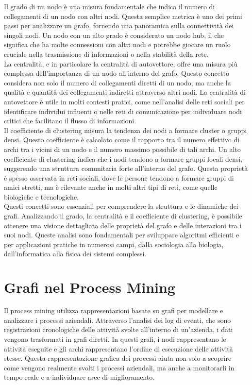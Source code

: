 \documentclass{article}
\begin{document}
Il grado di un nodo è una misura fondamentale che indica il numero di collegamenti di un nodo con altri nodi. Questa semplice metrica è uno dei primi passi per analizzare un grafo, fornendo una panoramica sulla connettività dei singoli nodi. Un nodo con un alto grado è considerato un nodo hub, il che significa che ha molte connessioni con altri nodi e potrebbe giocare un ruolo cruciale nella trasmissione di informazioni o nella stabilità della rete.\\
La centralità, e in particolare la centralità di autovettore, offre una misura più complessa dell'importanza di un nodo all'interno del grafo. Questo concetto considera non solo il numero di collegamenti diretti di un nodo, ma anche la qualità e quantità dei collegamenti indiretti attraverso altri nodi. La centralità di autovettore è utile in molti contesti pratici, come nell'analisi delle reti sociali per identificare individui influenti o nelle reti di comunicazione per individuare nodi critici che facilitano il flusso di informazioni.\\
Il coefficiente di clustering misura la tendenza dei nodi a formare cluster o gruppi densi. Questo coefficiente è calcolato come il rapporto tra il numero effettivo di archi tra i vicini di un nodo e il numero massimo possibile di tali archi. Un alto coefficiente di clustering indica che i nodi tendono a formare gruppi locali densi, suggerendo una struttura comunitaria forte all'interno del grafo. Questa proprietà è spesso osservata in reti sociali, dove le persone tendono a formare gruppi di amici stretti, ma è rilevante anche in molti altri tipi di reti, come quelle biologiche e tecnologiche.\\
Questi concetti sono essenziali per comprendere la struttura e le dinamiche dei grafi. Analizzando il grado, la centralità e il coefficiente di clustering, è possibile ottenere una visione dettagliata delle proprietà del grafo e delle interazioni tra i suoi nodi. Queste analisi sono fondamentali per sviluppare algoritmi efficienti e per applicazioni pratiche in numerosi campi, dalla sociologia alla biologia, dall'informatica alla fisica dei sistemi complessi.

\section{Grafi nel Process Mining}

Il process mining utilizza rappresentazioni basate su grafi per modellare e analizzare i processi aziendali. Attraverso l'analisi dei log di eventi, che sono registrazioni cronologiche delle attività svolte all'interno di un'azienda, i dati vengono trasformati in grafi diretti. In questi grafi, i nodi rappresentano le attività eseguite e gli archi rappresentano l'ordine di esecuzione delle attività stesse. Questa rappresentazione grafica dei processi aiuta non solo a scoprire come vengono realmente svolti i processi aziendali, ma anche a monitorarli in tempo reale e a individuare aree di miglioramento.
\end{document}
